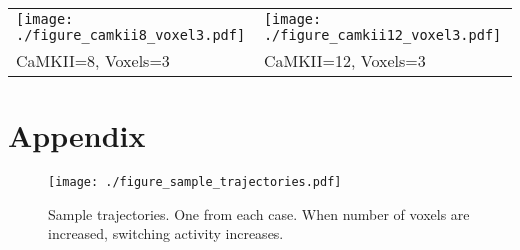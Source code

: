 \documentclass[]{article}
\begin{document}
\begin{longtable}[]{@{}ll@{}}
\toprule
\texttt{[image: ./figure\_camkii8\_voxel3.pdf]} &
\texttt{[image: ./figure\_camkii12\_voxel3.pdf]}\tabularnewline
CaMKII=8, Voxels=3 & CaMKII=12, Voxels=3\tabularnewline
\bottomrule
\end{longtable}

\newpage

\section{Appendix}\label{appendix}

\begin{figure}
\centering
\texttt{[image: ./figure\_sample\_trajectories.pdf]}
\caption{Sample trajectories. One from each case. When number of voxels
are increased, switching activity increases.}\label{fig:sample_trajs}
\end{figure}
\end{document}

